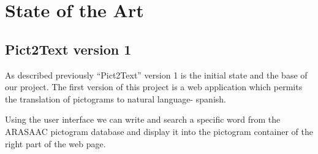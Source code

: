 
\chapter{State of the Art}
\label{State of the Art}

\section{Pict2Text version 1}
As described previously ``Pict2Text'' version 1 is the initial state and the base of our project. The first version of this project is a web application which permits the translation of pictograms to natural language- spanish. 

Using the user interface we can write and search a specific word from the ARASAAC pictogram database and display it into the pictogram container of the right part of the web page.
